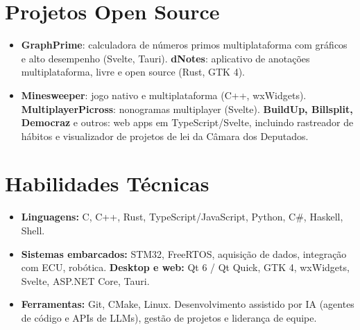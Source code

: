\documentclass[10pt,a4paper]{article}
\begin{document}
\section{Projetos Open Source}
\begin{itemize}
  \item \textbf{GraphPrime}: calculadora de números primos multiplataforma com gráficos e alto desempenho (Svelte, Tauri). \textbf{dNotes}: aplicativo de anotações multiplataforma, livre e open source (Rust, GTK 4).
  \item \textbf{Minesweeper}: jogo nativo e multiplataforma (C++, wxWidgets). \textbf{MultiplayerPicross}: nonogramas multiplayer (Svelte). \textbf{BuildUp, Billsplit, Democraz} e outros: web apps em TypeScript/Svelte, incluindo rastreador de hábitos e visualizador de projetos de lei da Câmara dos Deputados.
\end{itemize}


\section{Habilidades Técnicas}
\begin{itemize}
  \item \textbf{Linguagens:} C, C++, Rust, TypeScript/JavaScript, Python, C\#, Haskell, Shell.
  \item \textbf{Sistemas embarcados:} STM32, FreeRTOS, aquisição de dados, integração com ECU, robótica. \textbf{Desktop e web:} Qt 6 / Qt Quick, GTK 4, wxWidgets, Svelte, ASP.NET Core, Tauri.
  \item \textbf{Ferramentas:} Git, CMake, Linux. Desenvolvimento assistido por IA (agentes de código e APIs de LLMs), gestão de projetos e liderança de equipe.
\end{itemize}
\end{document}
